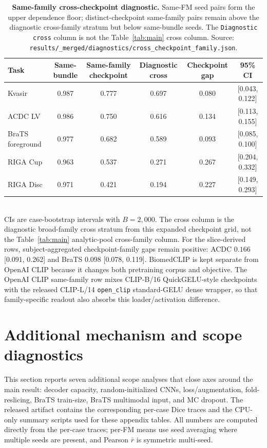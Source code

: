 \begin{table}[!htbp]
  \caption{\textbf{Same-family cross-checkpoint diagnostic.}
  Same-FM seed pairs form the upper dependence floor; distinct-checkpoint
  same-family pairs remain above the diagnostic cross-family stratum but below
  same-bundle seeds. The \texttt{Diagnostic cross} column is not the
  Table~\ref{tab:main} cross column. Source:
  \texttt{results/\_merged/diagnostics/cross\_checkpoint\_family.json}.}
  \label{tab:cross-checkpoint-family}
  \centering\scriptsize
  \setlength{\tabcolsep}{2.5pt}
  \begin{tabular*}{\linewidth}{@{\extracolsep{\fill}}lccccc}
    \toprule
    Task & Same-bundle & Same-family checkpoint & Diagnostic cross & Checkpoint gap & 95\% CI \\
    \midrule
    Kvasir & 0.987 & 0.777 & 0.697 & 0.080 & [0.043, 0.122] \\
    ACDC LV & 0.986 & 0.750 & 0.616 & 0.134 & [0.113, 0.155] \\
    BraTS foreground & 0.977 & 0.682 & 0.589 & 0.093 & [0.085, 0.100] \\
    RIGA Cup & 0.963 & 0.537 & 0.271 & 0.267 & [0.204, 0.332] \\
    RIGA Disc & 0.971 & 0.421 & 0.194 & 0.227 & [0.149, 0.293] \\
    \bottomrule
  \end{tabular*}
  \\[2pt]
  {\footnotesize CIs are case-bootstrap intervals with $B{=}2{,}000$. The cross column is the diagnostic broad-family cross stratum from this expanded checkpoint grid, not the Table~\ref{tab:main} analytic-pool cross-family column. For the slice-derived rows, subject-aggregated checkpoint-family gaps remain positive: ACDC $0.166$ [0.091, 0.262] and BraTS $0.098$ [0.078, 0.119]. BiomedCLIP is kept separate from OpenAI CLIP because it changes both pretraining corpus and objective. The OpenAI CLIP same-family row mixes CLIP-B/16 QuickGELU-style checkpoints with the released CLIP-L/14 \texttt{open\_clip} standard-GELU dense wrapper, so that family-specific readout also absorbs this loader/activation difference.}
\end{table}

\section{Additional mechanism and scope diagnostics}
\label{app:matrix-extra}

This section reports seven additional scope analyses that close axes around the
main result: decoder capacity, random-initialized CNNs, loss/augmentation,
fold-reslicing, BraTS train-size, BraTS multimodal input, and MC dropout. The
released artifact contains the corresponding per-case Dice traces and the
CPU-only summary scripts used for these appendix tables. All numbers are
computed directly from the per-case traces; per-FM means use seed averaging
where multiple seeds are present, and Pearson $\bar r$ is symmetric multi-seed.

